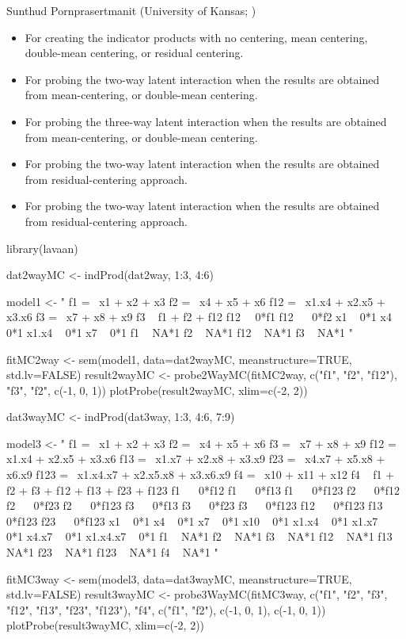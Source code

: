 \documentclass[a4paper]{book}
\begin{document}
%
\begin{Author}\relax
Sunthud Pornprasertmanit (University of Kansas; )
\end{Author}
%
\begin{SeeAlso}\relax
\begin{itemize}

\item {} For creating the indicator products with no centering, mean centering, double-mean centering, or residual centering.
\item {} For probing the two-way latent interaction when the results are obtained from mean-centering, or double-mean centering.
\item {} For probing the three-way latent interaction when the results are obtained from mean-centering, or double-mean centering.
\item {} For probing the two-way latent interaction when the results are obtained from residual-centering approach.
\item {} For probing the two-way latent interaction when the results are obtained from residual-centering approach.

\end{itemize}

\end{SeeAlso}
%
\begin{Examples}
\begin{ExampleCode}
library(lavaan) 

dat2wayMC <- indProd(dat2way, 1:3, 4:6)

model1 <- "
f1 =~ x1 + x2 + x3
f2 =~ x4 + x5 + x6
f12 =~ x1.x4 + x2.x5 + x3.x6
f3 =~ x7 + x8 + x9
f3 ~ f1 + f2 + f12
f12 ~~0*f1
f12 ~~ 0*f2
x1 ~ 0*1
x4 ~ 0*1
x1.x4 ~ 0*1
x7 ~ 0*1
f1 ~ NA*1
f2 ~ NA*1
f12 ~ NA*1
f3 ~ NA*1
"

fitMC2way <- sem(model1, data=dat2wayMC, meanstructure=TRUE, std.lv=FALSE)
result2wayMC <- probe2WayMC(fitMC2way, c("f1", "f2", "f12"), "f3", "f2", c(-1, 0, 1))
plotProbe(result2wayMC, xlim=c(-2, 2))


dat3wayMC <- indProd(dat3way, 1:3, 4:6, 7:9)

model3 <- "
f1 =~ x1 + x2 + x3
f2 =~ x4 + x5 + x6
f3 =~ x7 + x8 + x9
f12 =~ x1.x4 + x2.x5 + x3.x6
f13 =~ x1.x7 + x2.x8 + x3.x9
f23 =~ x4.x7 + x5.x8 + x6.x9
f123 =~ x1.x4.x7 + x2.x5.x8 + x3.x6.x9
f4 =~ x10 + x11 + x12
f4 ~ f1 + f2 + f3 + f12 + f13 + f23 + f123
f1 ~~ 0*f12
f1 ~~ 0*f13
f1 ~~ 0*f123
f2 ~~ 0*f12
f2 ~~ 0*f23
f2 ~~ 0*f123
f3 ~~ 0*f13
f3 ~~ 0*f23
f3 ~~ 0*f123
f12 ~~ 0*f123
f13 ~~ 0*f123
f23 ~~ 0*f123
x1 ~ 0*1
x4 ~ 0*1
x7 ~ 0*1
x10 ~ 0*1
x1.x4 ~ 0*1
x1.x7 ~ 0*1
x4.x7 ~ 0*1
x1.x4.x7 ~ 0*1
f1 ~ NA*1
f2 ~ NA*1
f3 ~ NA*1
f12 ~ NA*1
f13 ~ NA*1
f23 ~ NA*1
f123 ~ NA*1
f4 ~ NA*1
" 

fitMC3way <- sem(model3, data=dat3wayMC, meanstructure=TRUE, std.lv=FALSE)
result3wayMC <- probe3WayMC(fitMC3way, c("f1", "f2", "f3", "f12", "f13", "f23", "f123"), 
	"f4", c("f1", "f2"), c(-1, 0, 1), c(-1, 0, 1))
plotProbe(result3wayMC, xlim=c(-2, 2))
\end{ExampleCode}
\end{Examples}
\end{document}
